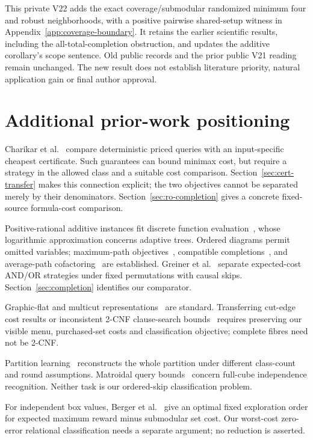 \documentclass[pdflatex,sn-mathphys-num]{sn-jnl}
\theoremstyle{thmstyleone}
\theoremstyle{thmstylethree}
\theoremstyle{thmstyletwo}
\begin{document}
This private V22 adds the exact coverage/submodular randomized minimum
four and robust neighborhoods, with a positive pairwise shared-setup
witness in Appendix~\ref{app:coverage-boundary}. It retains the earlier
scientific results, including the all-total-completion obstruction, and
updates the additive corollary's scope sentence. Old public records and
the prior public V21 reading remain unchanged. The new result does not
establish literature priority, natural application gain or final author
approval.




\section{Additional prior-work positioning}\label{app:additional-positioning}
Charikar et al.~\cite{charikar02} compare deterministic priced queries with an input-specific cheapest certificate. Such guarantees can bound minimax cost, but require a strategy in the allowed class and a suitable cost comparison. Section~\ref{sec:cert-transfer} makes this connection explicit; the two objectives cannot be separated merely by their denominators. Section~\ref{sec:ro-completion} gives a concrete fixed-source formula-cost comparison.

Positive-rational additive instances fit discrete function evaluation~\cite{cicalese14}, whose logarithmic approximation concerns adaptive trees. Ordered diagrams permit omitted variables; maximum-path objectives~\cite{ebendt06,ebendt05}, compatible completions~\cite{oliveira,sasao}, and average-path cofactoring~\cite{jiang} are established. Greiner et al.~\cite{greiner} separate expected-cost AND/OR strategies under fixed permutations with causal skips. Section~\ref{sec:completion} identifies our comparator.

Graphic-flat and multicut representations~\cite{berczi,hornakova} are standard. Transferring cut-edge cost results or inconsistent 2-CNF clause-search bounds~\cite{lovasz} requires preserving our visible menu, purchased-set costs and classification objective; complete fibres need not be 2-CNF.

Partition learning~\cite{liu,black} reconstructs the whole partition under different class-count and round assumptions. Matroidal query bounds~\cite{kulkarni} concern full-cube independence recognition. Neither task is our ordered-skip classification problem.

For independent box values, Berger et al.~\cite{pandora} give an optimal fixed exploration order for expected maximum reward minus submodular set cost. Our worst-cost zero-error relational classification needs a separate argument; no reduction is asserted.
\end{document}
